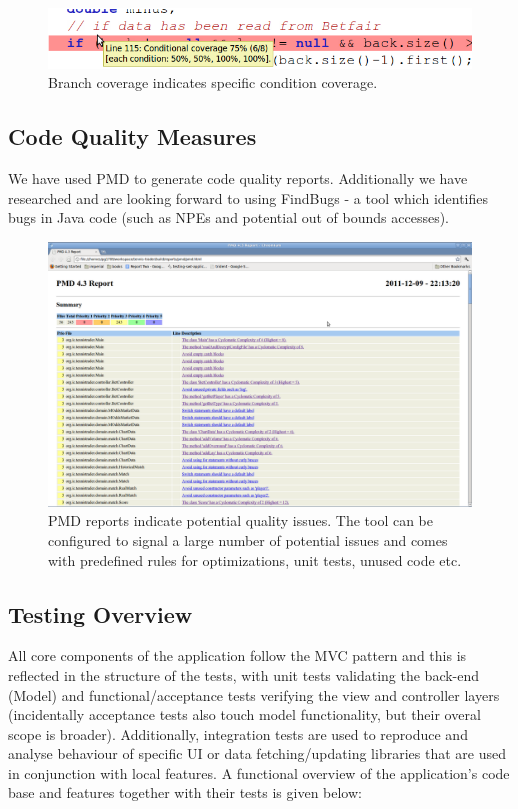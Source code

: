 \documentclass[10pt]{article}
\begin{document}
\begin{figure}[ht]
\centering
\includegraphics[bb=0 0 700 100, scale = 0.49]{branch.png}
\caption{Branch coverage indicates specific condition coverage.}
\end{figure}

\subsection{Code Quality Measures}
\label{sec-quality}
We have used PMD to generate code quality reports. Additionally we have researched and are looking forward to using FindBugs - a tool which identifies bugs in Java code (such as NPEs and potential out of bounds accesses).

\begin{figure}[ht]
\centering
\includegraphics[bb=0 0 1680 1050, scale = 0.2]{pmd.png}
\caption{PMD reports indicate potential quality issues. The tool can be configured to signal a large number of potential issues and comes with predefined rules for optimizations, unit tests, unused code etc.}
\end{figure}

\subsection{Testing Overview}

All core components of the application follow the MVC pattern and this is reflected in the structure of the tests, with unit tests validating the back-end (Model) and functional/acceptance tests verifying the view and controller layers (incidentally acceptance tests also touch model functionality, but their overal scope is broader). Additionally, integration tests are used to reproduce and analyse behaviour of specific UI or data fetching/updating libraries that are used in conjunction with local features. A functional overview of the application's code base and features together with their tests is given below:
\end{document}
